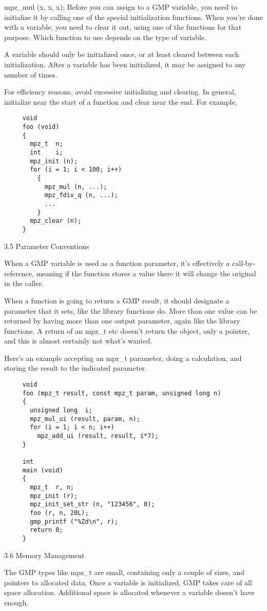      mpz\_mul (x, x, x);
Before you can assign to a GMP variable, you need to initialize it by calling
one of the special initialization functions. When you're done with a variable,
you need to clear it out, using one of the functions for that purpose. Which
function to use depends on the type of variable.

A variable should only be initialized once, or at least cleared between each
initialization. After a variable has been initialized, it may be assigned to any
number of times.

For efficiency reasons, avoid excessive initializing and clearing. In general,
initialize near the start of a function and clear near the end. For example,
\begin{lstlisting}
     void
     foo (void)
     {
       mpz_t  n;
       int    i;
       mpz_init (n);
       for (i = 1; i < 100; i++)
         {
           mpz_mul (n, ...);
           mpz_fdiv_q (n, ...);
           ...
         }
       mpz_clear (n);
     }
\end{lstlisting} 
3.5 Parameter Conventions

When a GMP variable is used as a function parameter, it's effectively a
call-by-reference, meaning if the function stores a value there it will change
the original in the caller.

When a function is going to return a GMP result, it should designate a
parameter that it sets, like the library functions do. More than one value can
be returned by having more than one output parameter, again like the library
functions. A return of an mpz\_t etc doesn't return the object, only a pointer,
and this is almost certainly not what's wanted.

Here's an example accepting an mpz\_t parameter, doing a calculation, and
storing the result to the indicated parameter.
\begin{lstlisting}
     void
     foo (mpz_t result, const mpz_t param, unsigned long n)
     {
       unsigned long  i;
       mpz_mul_ui (result, param, n);
       for (i = 1; i < n; i++)
         mpz_add_ui (result, result, i*7);
     }

     int
     main (void)
     {
       mpz_t  r, n;
       mpz_init (r);
       mpz_init_set_str (n, "123456", 0);
       foo (r, n, 20L);
       gmp_printf ("%Zd\n", r);
       return 0;
     }
\end{lstlisting} 
3.6 Memory Management

The GMP types like mpz\_t are small, containing only a couple of sizes, and
pointers to allocated data. Once a variable is initialized, GMP takes care of
all space allocation. Additional space is allocated whenever a variable doesn't
have enough.

